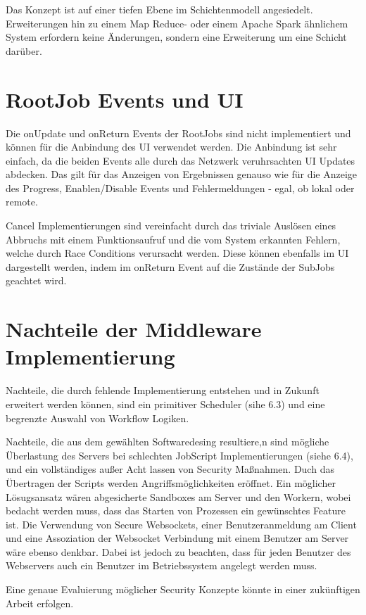 Das Konzept ist auf einer tiefen Ebene im Schichtenmodell angesiedelt. Erweiterungen hin zu einem Map Reduce- oder einem Apache Spark ähnlichem System erfordern keine Änderungen, sondern eine Erweiterung um eine Schicht darüber.


\section{RootJob Events und UI}
Die onUpdate und onReturn Events der RootJobs sind nicht implementiert und können für die Anbindung des UI verwendet werden. Die Anbindung ist sehr einfach, da die beiden Events alle durch das Netzwerk veruhrsachten UI Updates abdecken.
Das gilt für das Anzeigen von Ergebnissen genauso wie für die Anzeige des Progress, Enablen/Disable Events und Fehlermeldungen - egal, ob lokal oder remote.

Cancel Implementierungen sind vereinfacht durch das triviale Auslösen eines Abbruchs mit einem Funktionsaufruf und die vom System erkannten Fehlern, welche durch Race Conditions verursacht werden. Diese können ebenfalls im UI dargestellt werden, indem im onReturn Event auf die Zustände der SubJobs geachtet wird.




\section{Nachteile der Middleware Implementierung}
Nachteile, die durch fehlende Implementierung entstehen und in Zukunft erweitert werden können, sind ein primitiver Scheduler (sihe 6.3) und eine begrenzte Auswahl von Workflow Logiken.

Nachteile, die aus dem gewählten Softwaredesing resultiere,n sind mögliche Überlastung des Servers bei schlechten JobScript Implementierungen (siehe 6.4), und ein vollständiges außer Acht lassen von Security Maßnahmen. Duch das Übertragen der Scripts werden Angriffsmöglichkeiten eröffnet. Ein möglicher Lösugsansatz wären abgesicherte Sandboxes am Server und den Workern, wobei bedacht werden muss, dass das Starten von Prozessen ein gewünschtes Feature ist.
Die Verwendung von Secure Websockets, einer Benutzeranmeldung am Client und eine Assoziation der Websocket Verbindung mit einem Benutzer am Server wäre ebenso denkbar. Dabei ist jedoch zu beachten, dass für jeden Benutzer des Webservers auch ein Benutzer im Betriebssystem angelegt werden muss.

Eine genaue Evaluierung möglicher Security Konzepte könnte in einer zukünftigen Arbeit erfolgen.




